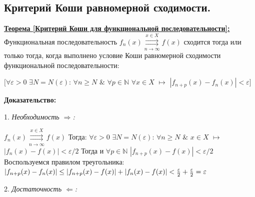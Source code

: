 \documentclass[a4paper,12pt]{article} %
\begin{document}
\subsection{Критерий Коши равномерной сходимости.}

\underline{\textbf{Теорема [Критерий Коши для функциональной последовательности]:}} Функциональная последовательность $f_n(x) \overset{x \in X}{\underset{n \rightarrow \infty}{\rightrightarrows}} f(x)$ сходится тогда или только тогда, когда выполнено условие Коши
равномерной сходимости функциональной последовательности: \newline

\hspace*{5mm}$\big[\forall \varepsilon > 0 $  $\exists N = N(\varepsilon)$: $\forall n \geq N$  $\&$ $\forall p \in  \mathds{N}$ $\forall x \in X$ $\longmapsto$ \newline 
\hspace*{50mm}$|f_{n+p}(x) -f_n(x)| < \varepsilon\big]$

\noindent \textbf{Доказательство:} \newline

 1. \textit{Необходимость $\Rightarrow$:} \newline

\noindent $f_n(x) \overset{x \in X}{\underset{n \rightarrow \infty}{\rightrightarrows}} f(x)$ 
\newline \newline
Тогда: \newline
\hspace*{5mm}$\forall \varepsilon > 0$ $\exists N = N(\varepsilon)$:
$\forall n \geq N$ $\&$ $x \in X$ $\longmapsto$ $|f_n(x) - f(x)| < \varepsilon / 2$ \newline
Тогда и 
\newline 
\hspace*{5mm}$\forall p \in \mathds{N}$ $|f_{n+p}(x) - f(x)| < \varepsilon / 2$
\newline \newline 
Воспользуемся правилом треугольника: \newline \newline
$|f_{n+p}(x) - f_n(x)| \leq |f_{n+p}(x) - f(x)| + |f_n(x) - f(x)| < {\varepsilon \over 2} + {\varepsilon \over 2} = \varepsilon$
\noindent  \newline \newline

2. \textit{Достаточность $\Leftarrow$:} \newline
\end{document}
